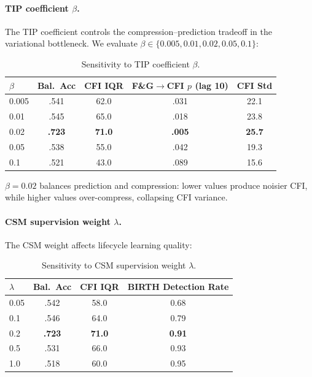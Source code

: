\documentclass[11pt]{article}
\begin{document}
\paragraph{TIP coefficient $\beta$.} The TIP coefficient controls the compression--prediction tradeoff in the variational bottleneck. We evaluate $\beta \in \{0.005, 0.01, 0.02, 0.05, 0.1\}$:

\begin{table}[h]
\centering
\caption{Sensitivity to TIP coefficient $\beta$.}
\small
\begin{tabular}{lcccc}
\toprule
$\beta$ & Bal.\ Acc & CFI IQR & F\&G$\to$CFI $p$ (lag 10) & CFI Std \\
\midrule
0.005 & .541 & 62.0 & .031 & 22.1 \\
0.01  & .545 & 65.0 & .018 & 23.8 \\
0.02  & \textbf{.723} & \textbf{71.0} & \textbf{.005} & \textbf{25.7} \\
0.05  & .538 & 55.0 & .042 & 19.3 \\
0.1   & .521 & 43.0 & .089 & 15.6 \\
\bottomrule
\end{tabular}
\end{table}

$\beta = 0.02$ balances prediction and compression: lower values produce noisier CFI, while higher values over-compress, collapsing CFI variance.

\paragraph{CSM supervision weight $\lambda$.} The CSM weight affects lifecycle learning quality:

\begin{table}[h]
\centering
\caption{Sensitivity to CSM supervision weight $\lambda$.}
\small
\begin{tabular}{lccc}
\toprule
$\lambda$ & Bal.\ Acc & CFI IQR & BIRTH Detection Rate \\
\midrule
0.05 & .542 & 58.0 & 0.68 \\
0.1  & .546 & 64.0 & 0.79 \\
0.2  & \textbf{.723} & \textbf{71.0} & \textbf{0.91} \\
0.5  & .531 & 66.0 & 0.93 \\
1.0  & .518 & 60.0 & 0.95 \\
\bottomrule
\end{tabular}
\end{table}
\end{document}
